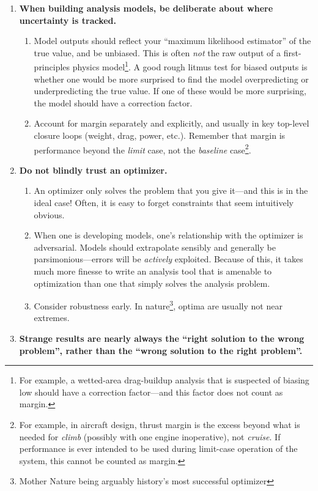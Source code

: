 \begin{enumerate}
\begin{enumerate}
    \end{enumerate}
    \item \textbf{When building analysis models, be deliberate about where uncertainty is tracked.}
    \begin{enumerate}
        \item Model outputs should reflect your ``maximum likelihood estimator'' of the true value, and be unbiased. This is often \emph{not} the raw output of a first-principles physics model\footnote{For example, a wetted-area drag-buildup analysis that is suspected of biasing low should have a correction factor—and this factor does not count as margin.}. A good rough litmus test for biased outputs is whether one would be more surprised to find the model overpredicting or underpredicting the true value. If one of these would be more surprising, the model should have a correction factor.
        \item Account for margin separately and explicitly, and usually in key top-level closure loops (weight, drag, power, etc.). Remember that margin is performance beyond the \emph{limit} case, not the \emph{baseline} case\footnote{For example, in aircraft design, thrust margin is the excess beyond what is needed for \emph{climb} (possibly with one engine inoperative), not \emph{cruise}. If performance is ever intended to be used during limit-case operation of the system, this cannot be counted as margin.}.
    \end{enumerate}
    \item \textbf{Do not blindly trust an optimizer.}
    \begin{enumerate}
        \item An optimizer only solves the problem that you give it—and this is in the ideal case! Often, it is easy to forget constraints that seem intuitively obvious.
        \item When one is developing models, one's relationship with the optimizer is adversarial. Models should extrapolate sensibly and generally be parsimonious—errors will be \emph{actively} exploited. Because of this, it takes much more finesse to write an analysis tool that is amenable to optimization than one that simply solves the analysis problem.
        \item Consider robustness early. In nature\footnote{Mother Nature being arguably history's most successful optimizer}, optima are usually not near extremes.
    \end{enumerate}
    \item \textbf{Strange results are nearly always the ``right solution to the wrong problem'', rather than the ``wrong solution to the right problem''.}

\end{enumerate}
